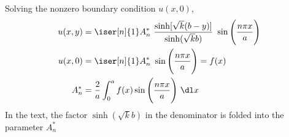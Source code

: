 \begin{enumerate}
\begin{align}
          \end{align}
          Solving the nonzero boundary condition $ u(x, 0) $,
          \begin{align}
              u(x, y) & = \iser[n]{1} A_n^*\ \frac{\sinh[\sqrt{k}(b-y)]}
              {\sinh(\sqrt{k}b)}\ \sin\Bigg( \frac{n\pi x}{a} \Bigg)                   \\
              u(x, 0) & = \iser[n]{1} A_n^*\ \sin\Bigg( \frac{n\pi x}{a} \Bigg) = f(x) \\
              A_n^*   & = \frac{2}{a} \int_{0}^{a} f(x) \sin\Bigg( \frac{n\pi x}{a}
              \Bigg)\ \dl x
          \end{align}
          In the text, the factor $ \sinh(\sqrt{k}b) $ in the denominator is folded into
          the parameter $ A_n^* $
\end{enumerate}